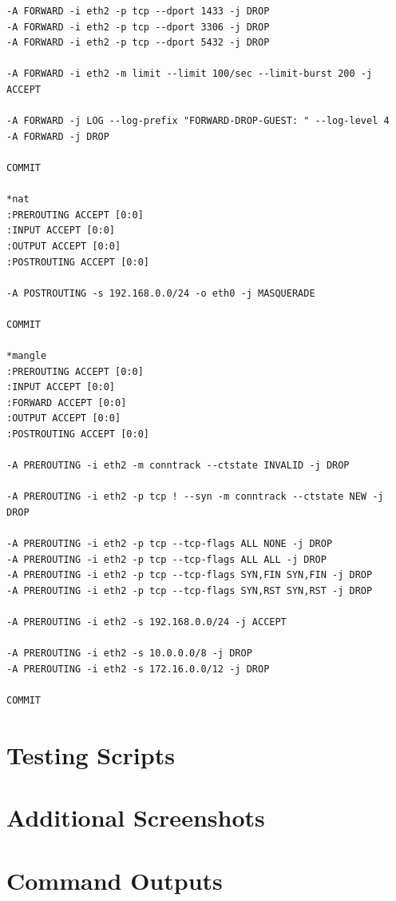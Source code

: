 \begin{verbatim}
-A FORWARD -i eth2 -p tcp --dport 1433 -j DROP
-A FORWARD -i eth2 -p tcp --dport 3306 -j DROP
-A FORWARD -i eth2 -p tcp --dport 5432 -j DROP

-A FORWARD -i eth2 -m limit --limit 100/sec --limit-burst 200 -j ACCEPT

-A FORWARD -j LOG --log-prefix "FORWARD-DROP-GUEST: " --log-level 4
-A FORWARD -j DROP

COMMIT

*nat
:PREROUTING ACCEPT [0:0]
:INPUT ACCEPT [0:0]
:OUTPUT ACCEPT [0:0]
:POSTROUTING ACCEPT [0:0]

-A POSTROUTING -s 192.168.0.0/24 -o eth0 -j MASQUERADE

COMMIT

*mangle
:PREROUTING ACCEPT [0:0]
:INPUT ACCEPT [0:0]
:FORWARD ACCEPT [0:0]
:OUTPUT ACCEPT [0:0]
:POSTROUTING ACCEPT [0:0]

-A PREROUTING -i eth2 -m conntrack --ctstate INVALID -j DROP

-A PREROUTING -i eth2 -p tcp ! --syn -m conntrack --ctstate NEW -j DROP

-A PREROUTING -i eth2 -p tcp --tcp-flags ALL NONE -j DROP
-A PREROUTING -i eth2 -p tcp --tcp-flags ALL ALL -j DROP
-A PREROUTING -i eth2 -p tcp --tcp-flags SYN,FIN SYN,FIN -j DROP
-A PREROUTING -i eth2 -p tcp --tcp-flags SYN,RST SYN,RST -j DROP

-A PREROUTING -i eth2 -s 192.168.0.0/24 -j ACCEPT

-A PREROUTING -i eth2 -s 10.0.0.0/8 -j DROP
-A PREROUTING -i eth2 -s 172.16.0.0/12 -j DROP

COMMIT
\end{verbatim}

\section{Testing Scripts}
\label{app:scripts}

\section{Additional Screenshots}
\label{app:screenshots}

\section{Command Outputs}
\label{app:outputs}
